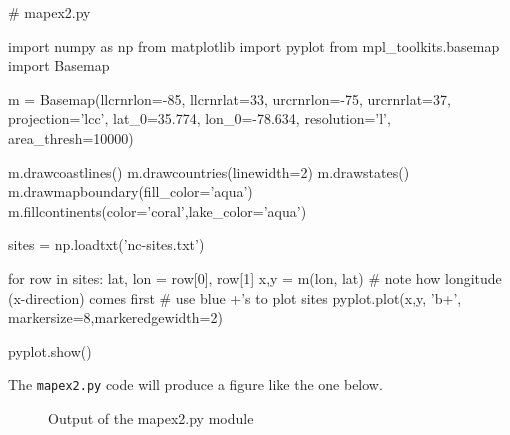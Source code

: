 \begin{python}
# mapex2.py

import numpy as np
from matplotlib import pyplot
from mpl_toolkits.basemap import Basemap

m = Basemap(llcrnrlon=-85, llcrnrlat=33, urcrnrlon=-75,
  urcrnrlat=37, projection='lcc', lat_0=35.774, lon_0=-78.634,
  resolution='l', area_thresh=10000)

m.drawcoastlines()
m.drawcountries(linewidth=2)
m.drawstates()
m.drawmapboundary(fill_color='aqua')
m.fillcontinents(color='coral',lake_color='aqua')

sites = np.loadtxt('nc-sites.txt')

for row in sites:
    lat, lon = row[0], row[1]
    x,y = m(lon, lat) # note how longitude (x-direction) comes first
    # use blue +'s to plot sites
    pyplot.plot(x,y, 'b+', markersize=8,markeredgewidth=2) 

pyplot.show()    
\end{python}
The \lstinline!mapex2.py! code will produce a figure like the one below.

\begin{figure}[htbp]
\centering
\caption{Output of the mapex2.py module}
\end{figure}
